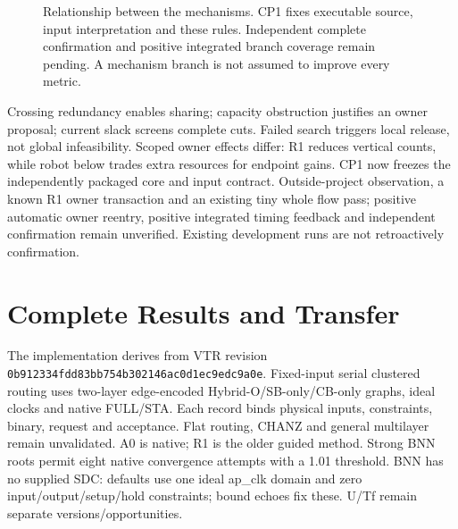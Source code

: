 \documentclass[conference,10pt]{IEEEtran}
\begin{document}
\begin{figure}[t]
\centering\footnotesize
{}
\caption{Relationship between the mechanisms. CP1 fixes executable source, input interpretation and these rules. Independent complete confirmation and positive integrated branch coverage remain pending. A mechanism branch is not assumed to improve every metric.}
\label{fig:method}
\end{figure}

Crossing redundancy enables sharing; capacity obstruction justifies an owner proposal; current slack screens complete cuts. Failed search triggers local release, not global infeasibility. Scoped owner effects differ: R1 reduces vertical counts, while robot below trades extra resources for endpoint gains. CP1 now freezes the independently packaged core and input contract. Outside-project observation, a known R1 owner transaction and an existing tiny whole flow pass; positive automatic owner reentry, positive integrated timing feedback and independent confirmation remain unverified. Existing development runs are not retroactively confirmation.
\section{Complete Results and Transfer}
The implementation derives from VTR revision \texttt{0b912334fdd83bb754b302146ac0d1ec9edc9a0e}. Fixed-input serial clustered routing uses two-layer edge-encoded Hybrid-O/SB-only/CB-only graphs, ideal clocks and native FULL/STA. Each record binds physical inputs, constraints, binary, request and acceptance. Flat routing, CHANZ and general multilayer remain unvalidated. A0 is native; R1 is the older guided method. Strong BNN roots permit eight native convergence attempts with a 1.01 threshold. BNN has no supplied SDC: defaults use one ideal ap\_clk domain and zero input/output/setup/hold constraints; bound echoes fix these. U/Tf remain separate versions/opportunities.
\end{document}
